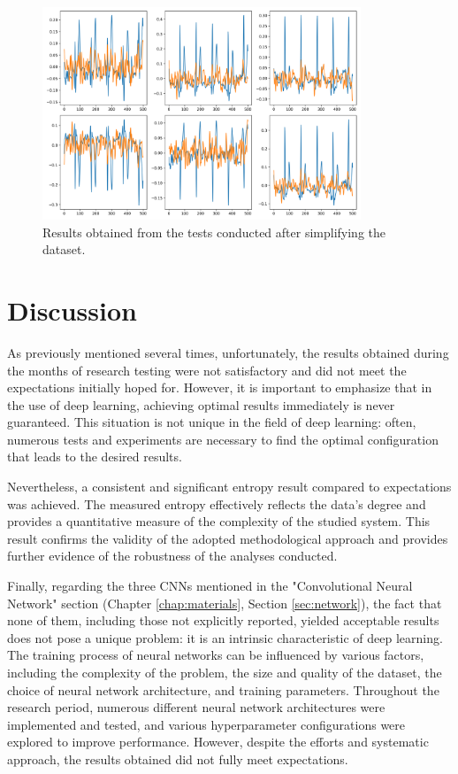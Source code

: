 \documentclass[12pt,english]{report}
\begin{document}
\begin{figure}[H]
    \centering
    \includegraphics[width=0.85\textwidth]{images/second_cnn_result_second_plot_1.png}
    \captionsetup{justification=centering}
    \caption{Results obtained from the tests conducted after simplifying the dataset.}
    \label{fig:second_cnn_result_second_plot_1}
\end{figure}

\section{Discussion}
\label{sec:discussione}

As previously mentioned several times, unfortunately, the results obtained during the months of research testing were not satisfactory and did not meet the expectations initially hoped for. However, it is important to emphasize that in the use of deep learning, achieving optimal results immediately is never guaranteed. This situation is not unique in the field of deep learning: often, numerous tests and experiments are necessary to find the optimal configuration that leads to the desired results.

Nevertheless, a consistent and significant entropy result compared to expectations was achieved. The measured entropy effectively reflects the data's degree and provides a quantitative measure of the complexity of the studied system. This result confirms the validity of the adopted methodological approach and provides further evidence of the robustness of the analyses conducted.

Finally, regarding the three CNNs mentioned in the "Convolutional Neural Network" section (Chapter \ref{chap:materials}, Section \ref{sec:network}), the fact that none of them, including those not explicitly reported, yielded acceptable results does not pose a unique problem: it is an intrinsic characteristic of deep learning. The training process of neural networks can be influenced by various factors, including the complexity of the problem, the size and quality of the dataset, the choice of neural network architecture, and training parameters. Throughout the research period, numerous different neural network architectures were implemented and tested, and various hyperparameter configurations were explored to improve performance. However, despite the efforts and systematic approach, the results obtained did not fully meet expectations.
\end{document}
